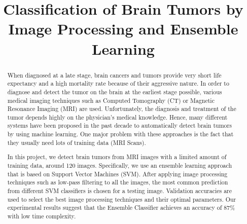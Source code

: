 \documentclass[conference]{IEEEtran}
\begin{document}
\title{Classification of Brain Tumors by Image Processing and Ensemble Learning\\}

\author{
\and
{}
\and
{}
}

\maketitle

\begin{abstract}
When diagnosed at a late stage, brain cancers and tumors provide very short life expectancy and a high mortality rate because of their aggressive nature. In order to diagnose and detect the tumor on the brain at the earliest stage possible, various medical imaging techniques such as Computed Tomography (CT) or Magnetic Resonance Imaging (MRI) are used. Unfortunately, the diagnosis and treatment of the tumor depends highly on the physician’s medical knowledge. Hence, many different systems have been proposed in the past decade to automatically detect brain tumors by using machine learning. One major problem with these approaches is the fact that they usually need lots of training data (MRI Scans).  

In this project, we detect brain tumors from MRI images with a limited amount of training data, around 120 images. Specifically, we use an ensemble learning approach that is based on Support Vector Machines (SVM). After applying image processing techniques such as low-pass filtering to all the images, the most common prediction from different SVM classifiers is chosen for a testing image. Validation accuracies are used to select the best image processing techniques and their optimal parameters. Our experimental results suggest that the Ensemble Classifier achieves an accuracy of 87\% with low time complexity.
\end{abstract}
\end{document}
